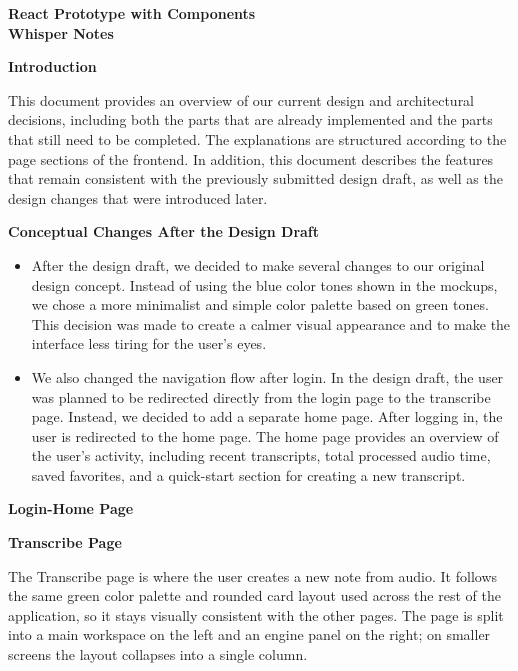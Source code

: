 \documentclass[11pt,a4paper]{article}
\begin{document}
\begin{center}
    {\Large \textbf{React Prototype with Components}}\\[0.02cm]
    {\large \textbf{Whisper Notes}}
\end{center}

\textbf{Introduction}

This document provides an overview of our current design and architectural decisions, including both the parts that are already implemented and the parts that still need to be completed. The explanations are structured according to the page sections of the frontend. In addition, this document describes the features that remain consistent with the previously submitted design draft, as well as the design changes that were introduced later.


\textbf{Conceptual Changes After the Design Draft}
\begin{itemize}
    \item After the design draft, we decided to make several changes to our original design concept. Instead of using the blue color tones shown in the mockups, we chose a more minimalist and simple color palette based on green tones. This decision was made to create a calmer visual appearance and to make the interface less tiring for the user’s eyes.
    \item We also changed the navigation flow after login. In the design draft, the user was planned to be redirected directly from the login page to the transcribe page. Instead, we decided to add a separate home page. After logging in, the user is redirected to the home page. The home page provides an overview of the user’s activity, including recent transcripts, total processed audio time, saved favorites, and a quick-start section for creating a new transcript.
\end{itemize}

\textbf{Login-Home Page}



\textbf{Transcribe Page}

The Transcribe page is where the user creates a new note from audio. It follows the same green color palette and rounded card layout used across the rest of the application, so it stays visually consistent with the other pages. The page is split into a main workspace on the left and an engine panel on the right; on smaller screens the layout collapses into a single column.
\end{document}
